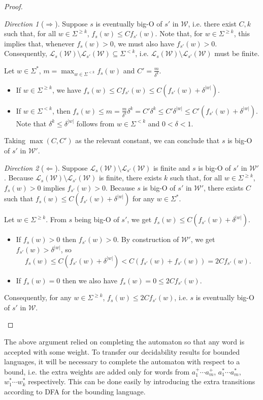 \documentclass[10pt,a4paper]{amsart}
\numberwithin{equation}{section}
\theoremstyle{plain}
\theoremstyle{definition}
\theoremstyle{remark}
\newtheorem{dir}{Direction}
\newcommand\lng[2]{\mathcal{L}_{#1}(#2)}
\newcommand\wa{\mathcal{W}}
\renewcommand\nu{f}
\begin{document}
\begin{proof}\hfill
\begin{dir}[$\Rightarrow$] Suppose $s$ is eventually big-O of $s'$ in $\wa$, i.e. there exist $C,k$ such that, for all $w\in \Sigma^{\ge k}$, $\nu_s(w)\le C \nu_{s'}(w)$.
Note that, for $w\in\Sigma^{\ge k}$, this implies that, whenever $\nu_s(w)>0$, we must also have $\nu_{s'}(w)>0$. Consequently, $\lng{s}{\wa}\setminus\lng{s'}{\wa}\subseteq \Sigma^{<k}$, i.e.
 $\lng{s}{\wa}\setminus\lng{s'}{\wa}$ must be finite.

 Let $w\in\Sigma^\ast$, $m= \max_{w\in \Sigma^{<k}} \nu_s (w)$ and $C'=\frac{m}{\delta^k}$.
 \begin{itemize}
 \item If $w\in \Sigma^{\ge k}$, we have $\nu_s(w)\le C \nu_{s'}(w) \le C(\nu_{s'}(w) + \delta^{|w|})$.
 \item If $w\in \Sigma^{<k}$, then $\nu_s(w)\le m = \frac{m}{\delta^k} \delta^k =C' \delta^k \le C'\delta^{|w|} \le C'(\nu_{s'}(w)+\delta^{|w|})$.
 Note that $\delta^k \le \delta^{|w|}$ follows from $w\in\Sigma^{<k}$ and $0<\delta<1$.
 \end{itemize}

 Taking  $\max(C,C')$ as the relevant constant, we can conclude that $s$ is big-O of $s'$ in $\wa'$.
 \end{dir}
 \begin{dir}[$\Leftarrow$]
Suppose $\lng{s}{\wa}\setminus\lng{s'}{\wa}$ is finite and $s$ is big-O of $s'$ in $\wa'$.
Because $\lng{s}{\wa}\setminus\lng{s'}{\wa}$ is finite, there exists $k$ such that, for all $w\in\Sigma^{\ge k}$, $\nu_s(w)>0$ implies $\nu_{s'}(w)>0$.
Because $s$ is big-O of $s'$ in $\wa'$, there exists $C$ such that $\nu_s(w)\le C(\nu_{s'}(w)+\delta^{|w|})$ for any $w\in\Sigma^\ast$.

Let $w\in\Sigma^{\ge k}$.
From $s$ being big-O of $s'$, we get $\nu_s(w)\le C (\nu_{s'}(w)+\delta^{|w|})$.
\begin{itemize}
\item If $\nu_s(w) > 0$ then $\nu_{s'}(w)>0$. By construction of $\wa'$, we get $\nu_{s'}(w)> \delta^{|w|}$, so
\[
\nu_s(w)\le C(\nu_{s'}(w) + \delta^{|w|}) < C(\nu_{s'}(w)+\nu_{s'}(w)) = 2C \nu_{s'}(w).
\]
\item If $\nu_s(w)=0$ then we also have $\nu_s(w) = 0 \le 2C \nu_{s'}(w)$.
\end{itemize}
Consequently, for any $w\in\Sigma^{\ge k}$, $\nu_s(w)\le 2C \nu_{s'}(w)$, i.e. $s$ is eventually big-O of $s'$ in $\wa$.\qedhere
\end{dir}
\end{proof}
The above argument relied on completing the automaton so that any word is accepted with some weight.
To transfer our decidability results for bounded languages, it will be necessary to complete the automaton with respect to a bound, i.e. the extra weights are added only for words from
$a_1^+\cdots a_m^+$, $a_1^\ast\cdots a_m^\ast$, $w_1^\ast\cdots w_k^\ast$ respectively.
This can be done easily by introducing the extra transitions according to DFA for the bounding language.
\end{document}
